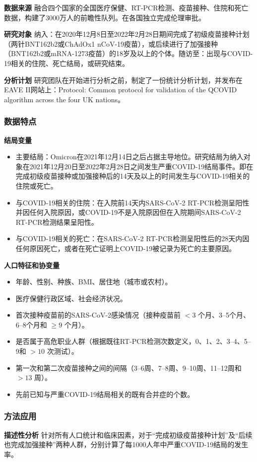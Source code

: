 \textbf{数据来源} 融合四个国家的全国医疗保健、RT-PCR检测、疫苗接种、住院和死亡数据，构建了3000万人的前瞻性队列。在各国独立完成伦理审批。

\textbf{研究对象} 纳入：在2020年12月8日至2022年2月28日期间完成了初级疫苗接种计划（两针BNT162b2或ChAdOx1 nCoV-19疫苗），或后续进行了加强接种（BNT162b2或mRNA-1273疫苗）的18岁及以上的个体。随访至：出现与COVID-19相关的住院、死亡结局，或研究结束。

\textbf{分析计划} 研究团队在开始进行分析之前，制定了一份统计分析计划，并发布在EAVE II网站上：Protocol: Common protocol for validation of the QCOVID algorithm across the four UK nations。
\subsubsection{数据特点}
\textbf{结局变量}
\begin{itemize}
\item 主要结局：Omicron在2021年12月14日之后占据主导地位。研究结局为纳入对象在2021年12月20日至2022年2月28日之间发生严重COVID-19结局事件。即在完成初级疫苗接种或加强接种后的14天及以上的时间发生与COVID-19相关的住院或死亡。
\item 与COVID-19相关的住院：在入院前14天内SARS-CoV-2 RT-PCR检测呈阳性并因任何入院原因，或COVID-19不是入院原因但在入院期间SARS-CoV-2 RT-PCR检测结果呈阳性。
\item 与COVID-19相关的死亡：在SARS-CoV-2 RT-PCR检测呈阳性后的28天内因任何原因死亡，或者在死亡证明上COVID-19被记录为死亡的主要原因。
\end{itemize}
\textbf{人口特征和协变量}
\begin{itemize}
\item 年龄、性别、种族、BMI、居住地（城市或农村）。
\item 医疗保健行政区域、社会经济状况。
\item 首次接种疫苗前的SARS-CoV-2感染情况（接种疫苗前 $<3$ 个月、3--5个月、6--8个月和 $\ge9$ 个月）。
\item 是否属于高危职业人群（根据既往RT-PCR检测次数定义，0、1、2、3--4、5--9和 $>10$ 次测试）。
\item 第一次和第二次疫苗接种之间的间隔（3--6周、7--8周、9--10周、11--12周和 $>13$ 周）。
\item 先前已知与严重COVID-19结局相关的既有合并症的个数。
\end{itemize}
\subsubsection{方法应用}
\textbf{描述性分析} 针对所有人口统计和临床因素，对于“完成初级疫苗接种计划”及“后续也完成加强接种”两种人群，分别计算了每1000人年中严重COVID-19结局的发生率。

